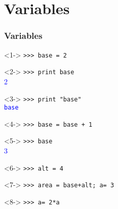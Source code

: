 \documentclass[12pt]{beamer}
\begin{document}
\section{Variables}
\begin{frame}[fragile]
\frametitle{Variables}
\fontsize{10}{10}\selectfont
\begin{minipage}{5.5cm}
\begin{exampleblock}{}<1->
 \verb|>>> base = 2| \\
\end{exampleblock}
\begin{exampleblock}{}<2->
 \verb|>>> print base| \\
 \pause
 \textcolor{blue}{2}
\end{exampleblock}
\begin{exampleblock}{}<3->
 \verb|>>> print "base"| \\
 \pause 
 \textcolor{blue}{\texttt{base}}
\end{exampleblock}
\begin{exampleblock}{}<4->
 \verb|>>> base = base + 1|
\end{exampleblock}
\end{minipage}
\hspace{0.5cm}
\begin{minipage}{5.5cm}
\begin{exampleblock}{}<5->
 \verb|>>> base| \\
 \pause
 \textcolor{blue}{3}
\end{exampleblock}
\begin{exampleblock}{}<6->
 \verb|>>> alt = 4| \\
\end{exampleblock}
\begin{exampleblock}{}<7->
 \verb|>>> area = base+alt; a= 3|
\end{exampleblock}
\begin{exampleblock}{}<8->
 \verb|>>> a= 2*a| \\
\end{exampleblock}
\end{minipage}
\end{frame}
\end{document}
